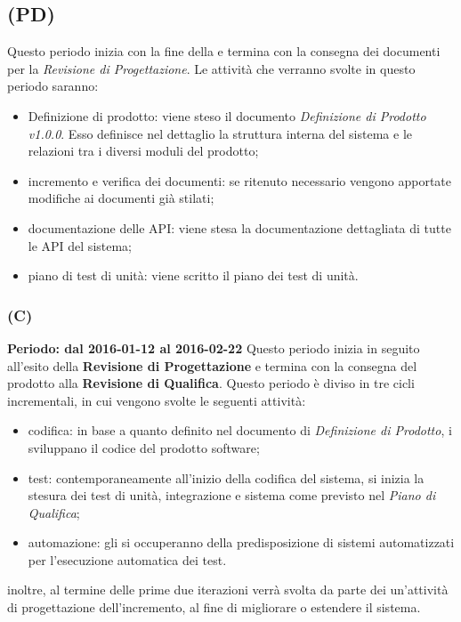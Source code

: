 \documentclass[./PianoDiProgetto.tex]{subfiles}
\begin{document}
  \subsection{\PerPD{} (PD)}

  Questo periodo inizia con la fine della \PerPA e termina con la consegna dei documenti per la \textit{Revisione di Progettazione}. Le attività che verranno svolte in questo periodo saranno:
  \begin{itemize}
    \item Definizione di prodotto: viene steso il documento \textit{Definizione di Prodotto v1.0.0}. Esso definisce nel dettaglio la struttura interna del sistema e le relazioni tra i diversi moduli del prodotto;
    \item incremento e verifica dei documenti: se ritenuto necessario vengono apportate modifiche ai documenti già stilati;
    \item documentazione delle API: viene stesa la documentazione dettagliata di tutte le API del sistema;
    \item piano di test di unità: viene scritto il piano dei test di unità.
  \end{itemize}
  \subsubsection{\PerC{} (C)}
  \textbf{Periodo: dal 2016-01-12 al 2016-02-22}
  Questo periodo inizia in seguito all'esito della \textbf{Revisione di Progettazione} e termina con la consegna del prodotto alla \textbf{Revisione di Qualifica}. Questo periodo è diviso in tre cicli incrementali, in cui vengono svolte le seguenti attività:
  \begin{itemize}
    \item codifica: in base a quanto definito nel documento di \textit{Definizione di Prodotto}, i \PRP{} sviluppano il codice del prodotto software;
    \item test: contemporaneamente all'inizio della codifica del sistema, si inizia la stesura dei test di unità, integrazione e sistema come previsto nel \textit{Piano di Qualifica};
    \item automazione: gli \AMMP{} si occuperanno della predisposizione di sistemi automatizzati per l'esecuzione automatica dei test.
  \end{itemize}
  inoltre, al termine delle prime due iterazioni verrà svolta da parte dei \PJP un'attività di progettazione dell'incremento, al fine di migliorare o estendere il sistema.
\end{document}
